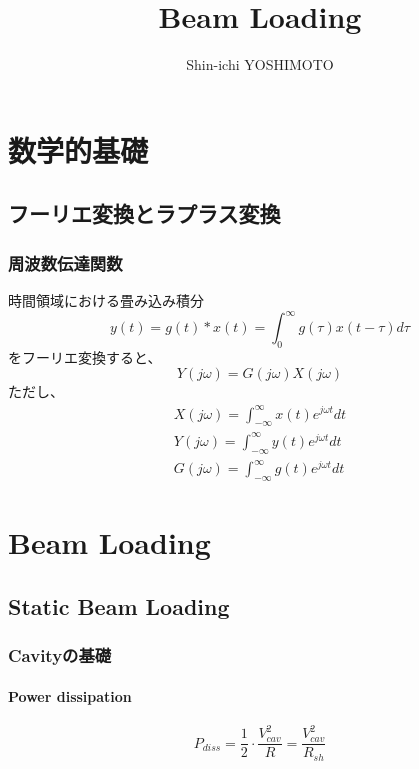 \documentclass[book]{jlreq}
\begin{document}
\title{Beam Loading}
\author{Shin-ichi YOSHIMOTO}
\maketitle
\tableofcontents

\part{数学的基礎}
\chapter{フーリエ変換とラプラス変換}
\section{周波数伝達関数}

時間領域における畳み込み積分
%
\begin{equation}
    y(t) = g(t)*x(t) = \int_0^{\infty} g(\tau) x(t - \tau) d\tau
\end{equation}
%
をフーリエ変換すると、
%
\begin{equation}
    Y(j\omega) = G(j\omega) X(j\omega)
\end{equation}
%
ただし、
%
\begin{equation}
    \begin{split}
        X(j\omega) = \int_{-\infty}^{\infty} x(t) e^{j\omega t} dt \\
        Y(j\omega) = \int_{-\infty}^{\infty} y(t) e^{j\omega t} dt \\
        G(j\omega) = \int_{-\infty}^{\infty} g(t) e^{j\omega t} dt
    \end{split}
\end{equation}

\part{Beam Loading}
\chapter{Static Beam Loading}
\section{Cavityの基礎}
\subsection{Power dissipation}
\begin{equation}
    P_{diss} = \frac{1}{2} \cdot \frac{V_{cav}^2}{R} = \frac{V_{cav}^2}{R_{sh}} 
\end{equation}
\end{document}
